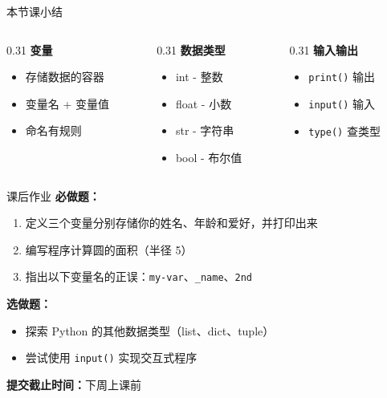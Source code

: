 \documentclass[aspectratio=43,12pt]{beamer}
\begin{document}
\begin{frame}{本节课小结}
    \begin{columns}[T]
        \begin{column}{0.31\textwidth}
            \textbf{变量}
            \begin{itemize}
                \item 存储数据的容器
                \item 变量名 + 变量值
                \item 命名有规则
            \end{itemize}
        \end{column}
        \begin{column}{0.31\textwidth}
            \textbf{数据类型}
            \begin{itemize}
                \item int - 整数
                \item float - 小数
                \item str - 字符串
                \item bool - 布尔值
            \end{itemize}
        \end{column}
        \begin{column}{0.31\textwidth}
            \textbf{输入输出}
            \begin{itemize}
                \item \texttt{print()} 输出
                \item \texttt{input()} 输入
                \item \texttt{type()} 查类型
            \end{itemize}
        \end{column}
    \end{columns}
\end{frame}

\begin{frame}{课后作业}
    \textbf{必做题：}
    \begin{enumerate}
        \item 定义三个变量分别存储你的姓名、年龄和爱好，并打印出来
        \item 编写程序计算圆的面积（半径 5）
        \item 指出以下变量名的正误：\texttt{my-var}、\texttt{\_name}、\texttt{2nd}
    \end{enumerate}
    
    \vspace{1em}
    \textbf{选做题：}
    \begin{itemize}
        \item 探索 Python 的其他数据类型（list、dict、tuple）
        \item 尝试使用 \texttt{input()} 实现交互式程序
    \end{itemize}
    
    \vspace{0.5em}
    \textbf{提交截止时间：}下周上课前
\end{frame}
\end{document}
